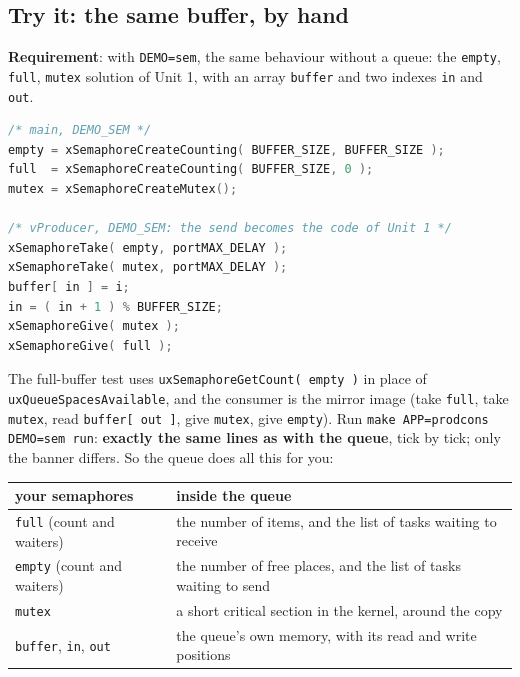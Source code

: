 \subsection{Try it: the same buffer, by hand}
\textbf{Requirement}: with \texttt{DEMO=sem}, the same behaviour without a queue: the \texttt{empty}, \texttt{full}, \texttt{mutex} solution of Unit 1, with an array \texttt{buffer} and two indexes \texttt{in} and \texttt{out}.
\begin{lstlisting}[language=C, showstringspaces=false, basicstyle=\ttfamily\scriptsize]
/* main, DEMO_SEM */
empty = xSemaphoreCreateCounting( BUFFER_SIZE, BUFFER_SIZE );
full  = xSemaphoreCreateCounting( BUFFER_SIZE, 0 );
mutex = xSemaphoreCreateMutex();

/* vProducer, DEMO_SEM: the send becomes the code of Unit 1 */
xSemaphoreTake( empty, portMAX_DELAY );
xSemaphoreTake( mutex, portMAX_DELAY );
buffer[ in ] = i;
in = ( in + 1 ) % BUFFER_SIZE;
xSemaphoreGive( mutex );
xSemaphoreGive( full );
\end{lstlisting}
The full-buffer test uses \texttt{uxSemaphoreGetCount(~empty~)} in place of \texttt{uxQueue\-Spaces\-Available}, and the consumer is the mirror image (take \texttt{full}, take \texttt{mutex}, read \texttt{buffer[ out ]}, give \texttt{mutex}, give \texttt{empty}). Run \texttt{make APP=prodcons DEMO=sem run}: \textbf{exactly the same lines as with the queue}, tick by tick; only the banner differs. So the queue does all this for you:
\begin{center}
\small
\begin{tabular}{P{0.3} P{0.55}}
    \hline
    \textbf{your semaphores} & \textbf{inside the queue} \\
    \hline
    \texttt{full} (count and waiters) & the number of items, and the list of tasks waiting to receive \\
    \texttt{empty} (count and waiters) & the number of free places, and the list of tasks waiting to send \\
    \texttt{mutex} & a short critical section in the kernel, around the copy \\
    \texttt{buffer}, \texttt{in}, \texttt{out} & the queue's own memory, with its read and write positions \\
    \hline
\end{tabular}
\end{center}

